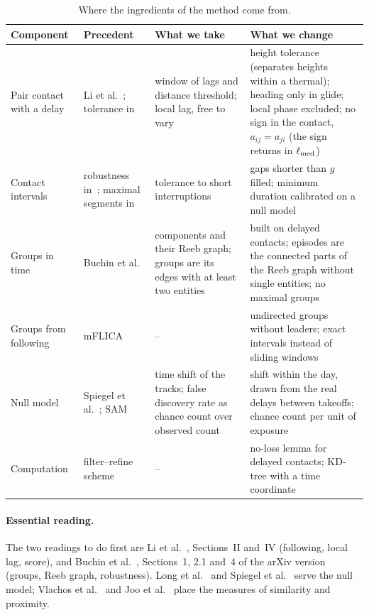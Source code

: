 \begin{table}
\centering
\small
\begin{tabularx}{\textwidth}{@{}>{\raggedright}p{2.1cm} >{\raggedright}p{2.6cm} >{\raggedright}X >{\raggedright\arraybackslash}X@{}}
\toprule
Component & Precedent & What we take & What we change \\
\midrule
Pair contact with a delay & Li et al.~\cite{li2013}; tolerance in~\cite{vlachos2002,chen2005,sakoe1978} &
  window of lags and distance threshold; local lag, free to vary &
  height tolerance (separates heights within a thermal); heading only in glide; local phase
  excluded; no sign in the contact, $a_{ij}=a_{ji}$ (the sign returns in $\ell_{\rm med}$) \\ \addlinespace
Contact intervals & robustness in~\cite{buchin2015}; maximal segments in~\cite{li2013} &
  tolerance to short interruptions &
  gaps shorter than $g$ filled; minimum duration calibrated on a null model \\ \addlinespace
Groups in time & Buchin et al.~\cite{buchin2015} & components and their Reeb graph; groups
  are its edges with at least two entities &
  built on delayed contacts; episodes are the connected parts of the Reeb graph without single
  entities; no maximal groups \\ \addlinespace
Groups from following & mFLICA~\cite{amornbunchornvej2021} & -- &
  undirected groups without leaders; exact intervals instead of sliding windows \\ \addlinespace
Null model & Spiegel et al.~\cite{spiegel2016}; SAM~\cite{tusher2001} & time shift of the tracks;
  false discovery rate as chance count over observed count &
  shift within the day, drawn from the real delays between takeoffs; chance count per unit of
  exposure \\ \addlinespace
Computation & filter--refine scheme & -- &
  no-loss lemma for delayed contacts; KD-tree with a time coordinate \\
\bottomrule
\end{tabularx}
\caption{Where the ingredients of the method come from.}
\label{tab:origin}
\end{table}

\paragraph{Essential reading.} The two readings to do first are Li et al.~\cite{li2013},
Sections~II and~IV (following, local lag, score), and Buchin et al.~\cite{buchin2015}, Sections~1,
2.1 and~4 of the arXiv version (groups, Reeb graph, robustness). Long et al.~\cite{long2014} and
Spiegel et al.~\cite{spiegel2016} serve the null model; Vlachos et al.~\cite{vlachos2002} and Joo
et al.~\cite{joo2018} place the measures of similarity and proximity.

